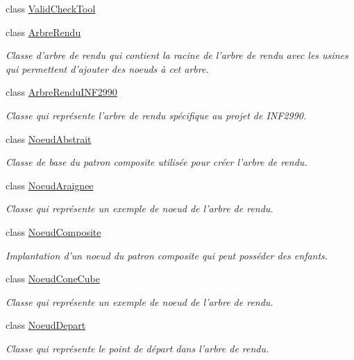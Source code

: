 \begin{DoxyCompactItemize}
class \hyperlink{class_valid_check_tool}{Valid\-Check\-Tool}
\item 
class \hyperlink{class_arbre_rendu}{Arbre\-Rendu}
\begin{DoxyCompactList}\small\item\em Classe d'arbre de rendu qui contient la racine de l'arbre de rendu avec les usines qui permettent d'ajouter des noeuds à cet arbre. \end{DoxyCompactList}\item 
class \hyperlink{class_arbre_rendu_i_n_f2990}{Arbre\-Rendu\-I\-N\-F2990}
\begin{DoxyCompactList}\small\item\em Classe qui représente l'arbre de rendu spécifique au projet de I\-N\-F2990. \end{DoxyCompactList}\item 
class \hyperlink{class_noeud_abstrait}{Noeud\-Abstrait}
\begin{DoxyCompactList}\small\item\em Classe de base du patron composite utilisée pour créer l'arbre de rendu. \end{DoxyCompactList}\item 
class \hyperlink{class_noeud_araignee}{Noeud\-Araignee}
\begin{DoxyCompactList}\small\item\em Classe qui représente un exemple de noeud de l'arbre de rendu. \end{DoxyCompactList}\item 
class \hyperlink{class_noeud_composite}{Noeud\-Composite}
\begin{DoxyCompactList}\small\item\em Implantation d'un noeud du patron composite qui peut posséder des enfants. \end{DoxyCompactList}\item 
class \hyperlink{class_noeud_cone_cube}{Noeud\-Cone\-Cube}
\begin{DoxyCompactList}\small\item\em Classe qui représente un exemple de noeud de l'arbre de rendu. \end{DoxyCompactList}\item 
class \hyperlink{class_noeud_depart}{Noeud\-Depart}
\begin{DoxyCompactList}\small\item\em Classe qui représente le point de départ dans l'arbre de rendu. \end{DoxyCompactList}\item 

\end{DoxyCompactItemize}
